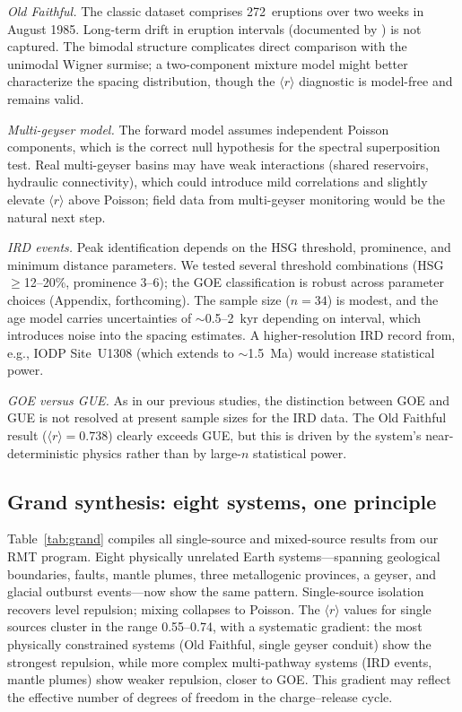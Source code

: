 \documentclass[12pt,a4paper]{article}
\begin{document}
\emph{Old Faithful.} The classic dataset comprises 272~eruptions over two weeks in August 1985. Long-term drift in eruption intervals (documented by \citealp{hurwitz2014}) is not captured. The bimodal structure complicates direct comparison with the unimodal Wigner surmise; a two-component mixture model might better characterize the spacing distribution, though the $\langle r\rangle$ diagnostic is model-free and remains valid.

\emph{Multi-geyser model.} The forward model assumes independent Poisson components, which is the correct null hypothesis for the spectral superposition test. Real multi-geyser basins may have weak interactions (shared reservoirs, hydraulic connectivity), which could introduce mild correlations and slightly elevate $\langle r\rangle$ above Poisson; field data from multi-geyser monitoring would be the natural next step.

\emph{IRD events.} Peak identification depends on the HSG threshold, prominence, and minimum distance parameters. We tested several threshold combinations (HSG $\geq$12--20\%, prominence 3--6); the GOE classification is robust across parameter choices (Appendix, forthcoming). The sample size ($n=34$) is modest, and the age model carries uncertainties of $\sim$0.5--2~kyr depending on interval, which introduces noise into the spacing estimates. A higher-resolution IRD record from, e.g., IODP Site~U1308 (which extends to $\sim$1.5~Ma) would increase statistical power.

\emph{GOE versus GUE.} As in our previous studies, the distinction between GOE and GUE is not resolved at present sample sizes for the IRD data. The Old Faithful result ($\langle r\rangle=0.738$) clearly exceeds GUE, but this is driven by the system's near-deterministic physics rather than by large-$n$ statistical power.

\subsection{Grand synthesis: eight systems, one principle}

Table~\ref{tab:grand} compiles all single-source and mixed-source results from our RMT program. Eight physically unrelated Earth systems---spanning geological boundaries, faults, mantle plumes, three metallogenic provinces, a geyser, and glacial outburst events---now show the same pattern. Single-source isolation recovers level repulsion; mixing collapses to Poisson. The $\langle r\rangle$ values for single sources cluster in the range 0.55--0.74, with a systematic gradient: the most physically constrained systems (Old Faithful, single geyser conduit) show the strongest repulsion, while more complex multi-pathway systems (IRD events, mantle plumes) show weaker repulsion, closer to GOE. This gradient may reflect the effective number of degrees of freedom in the charge--release cycle.
\end{document}
